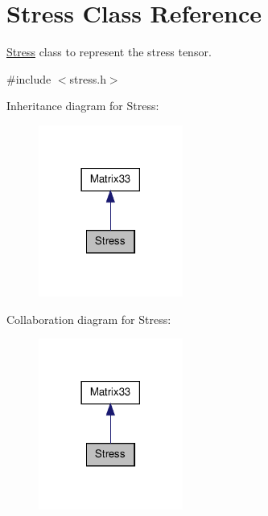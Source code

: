 \hypertarget{classStress}{\section{\-Stress \-Class \-Reference}
\label{d1/d1c/classStress}
}


\hyperlink{classStress}{\-Stress} class to represent the stress tensor.  




{\ttfamily \#include $<$stress.\-h$>$}



\-Inheritance diagram for \-Stress\-:
\nopagebreak
\begin{figure}[H]
\begin{center}
\leavevmode
\includegraphics[width=134pt]{dd/d46/classStress__inherit__graph}
\end{center}
\end{figure}


\-Collaboration diagram for \-Stress\-:
\nopagebreak
\begin{figure}[H]
\begin{center}
\leavevmode
\includegraphics[width=134pt]{d7/dfa/classStress__coll__graph}
\end{center}
\end{figure}
